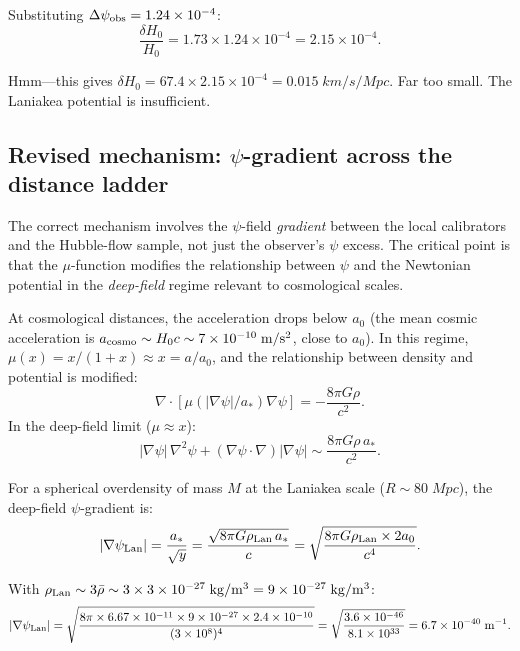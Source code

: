 \documentclass[aps,prd,twocolumn,superscriptaddress,nofootinbib,longbibliography]{revtex4-2}
\newcommand{\astar}{a_*}
\begin{document}
Substituting $\Delta\psi_{\rm obs} = 1.24\times10^{-4}$:
\begin{equation}
\frac{\delta H_0}{H_0} = 1.73\times1.24\times10^{-4} = 2.15\times10^{-4}.
\end{equation}

Hmm---this gives $\delta H_0 = 67.4\times2.15\times10^{-4} = 0.015\;\si{km/s/Mpc}$.
Far too small. The Laniakea potential is insufficient.

\subsection{Revised mechanism: $\psi$-gradient across the distance
ladder}\label{sec:revised}

The correct mechanism involves the $\psi$-field \emph{gradient} between
the local calibrators and the Hubble-flow sample, not just the observer's
$\psi$ excess. The critical point is that the $\mu$-function modifies
the relationship between $\psi$ and the Newtonian potential in the
\emph{deep-field} regime relevant to cosmological scales.

At cosmological distances, the acceleration drops below $a_0$
(the mean cosmic acceleration is
$a_{\rm cosmo} \sim H_0 c \sim 7\times10^{-10}\;\si{m/s^2}$,
close to $a_0$). In this regime,
$\mu(x) = x/(1+x) \approx x = a/a_0$, and the relationship between
density and potential is modified:
\begin{equation}
\nabla\cdot[\mu(|\nabla\psi|/\astar)\nabla\psi] = -\frac{8\pi G\rho}{c^2}.
\end{equation}
In the deep-field limit ($\mu \approx x$):
\begin{equation}
|\nabla\psi|\,\nabla^2\psi + (\nabla\psi\cdot\nabla)|\nabla\psi| \sim \frac{8\pi G\rho\,\astar}{c^2}.
\end{equation}

For a spherical overdensity of mass $M$ at the Laniakea scale ($R \sim 80\;\si{Mpc}$),
the deep-field $\psi$-gradient is:
\begin{equation}
|\nabla\psi_{\rm Lan}| = \frac{\astar}{\sqrt{y}} = \frac{\sqrt{8\pi G\rho_{\rm Lan}\,\astar}}{c}
= \sqrt{\frac{8\pi G\rho_{\rm Lan}\times 2a_0}{c^4}}.
\end{equation}

With $\rho_{\rm Lan} \sim 3\bar{\rho} \sim 3\times 3\times10^{-27}\;\si{kg/m^3}
= 9\times10^{-27}\;\si{kg/m^3}$:
\begin{equation}
|\nabla\psi_{\rm Lan}| = \sqrt{\frac{8\pi\times6.67\times10^{-11}\times9\times10^{-27}
\times2.4\times10^{-10}}{(3\times10^8)^4}}
= \sqrt{\frac{3.6\times10^{-46}}{8.1\times10^{33}}} = 6.7\times10^{-40}\;\si{m^{-1}}.
\end{equation}
\end{document}

